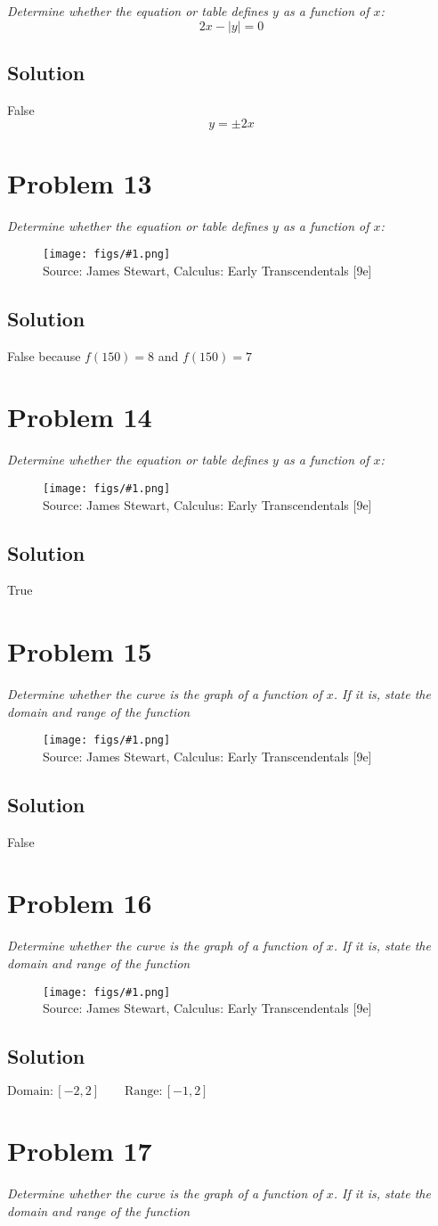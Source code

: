 \documentclass[11pt]{article}
\newcommand{\soln}{\subsection*}
\newcommand{\qn}{\textit}
\newcommand{\imagesource}[1]{{\footnotesize Source: #1}}
\newcommand{\imgqn}[1]{
	\begin{figure}[H]
		\centering
		\texttt{[image: figs/\#1.png]}\\
		\imagesource{James Stewart, Calculus: Early Transcendentals [9e]}
	\end{figure}
}
\begin{document}
\qn{Determine whether the equation or table defines $y$ as a function of $x$: $$2x-|y|=0$$}

\soln{Solution}
False
$$y=\pm2x$$

\section*{Problem 13}

\qn{Determine whether the equation or table defines $y$ as a function of $x$:}

\imgqn{1.1.13}

\soln{Solution}
False because $f(150)=8$ and $f(150)=7$

\section*{Problem 14}

\qn{Determine whether the equation or table defines $y$ as a function of $x$:}

\imgqn{1.1.14}

\soln{Solution}
True

\section*{Problem 15}

\qn{Determine whether the curve is the graph of a function of $x$. If it is, state the domain and range of the function}

\imgqn{1.1.15}

\soln{Solution}
False

\section*{Problem 16}

\qn{Determine whether the curve is the graph of a function of $x$. If it is, state the domain and range of the function}

\imgqn{1.1.16}

\soln{Solution}
$\mathrm{Domain}:[-2,2] \qquad\mathrm{Range}:[-1,2]$

\section*{Problem 17}

\qn{Determine whether the curve is the graph of a function of $x$. If it is, state the domain and range of the function}
\end{document}
